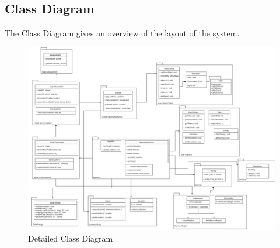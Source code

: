 \documentclass[11pt]{article}
\begin{document}
\subsection{Class Diagram}
The Class Diagram gives an overview of the layout of the system.
\begin{figure}
   \centering
   \includegraphics[width=\textwidth]{diagram/class_diagram_final2.png} %
   \caption{Detailed Class Diagram}
   \label{fig:dcd}
\end{figure}
\end{document}
